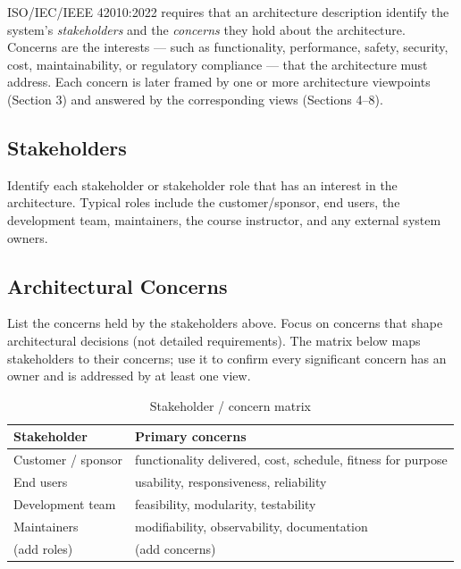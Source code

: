 ISO/IEC/IEEE 42010:2022 \cite{ISO42010} requires that an architecture description identify the system's \textit{stakeholders} and the \textit{concerns} they hold about the architecture. Concerns are the interests --- such as functionality, performance, safety, security, cost, maintainability, or regulatory compliance --- that the architecture must address. Each concern is later framed by one or more architecture viewpoints (Section 3) and answered by the corresponding views (Sections 4--8).

\subsection{Stakeholders}
Identify each stakeholder or stakeholder role that has an interest in the architecture. Typical roles include the customer/sponsor, end users, the development team, maintainers, the course instructor, and any external system owners.

\subsection{Architectural Concerns}
List the concerns held by the stakeholders above. Focus on concerns that shape architectural decisions (not detailed requirements). The matrix below maps stakeholders to their concerns; use it to confirm every significant concern has an owner and is addressed by at least one view.

\begin{table}[H]
\caption{Stakeholder / concern matrix}
\begin{center}
    \begin{tabular}{ | p{4cm} | p{9cm} |}
    \hline
    \textbf{Stakeholder} & \textbf{Primary concerns} \\ \hline
    Customer / sponsor & functionality delivered, cost, schedule, fitness for purpose \\ \hline
    End users & usability, responsiveness, reliability \\ \hline
    Development team & feasibility, modularity, testability \\ \hline
    Maintainers & modifiability, observability, documentation \\ \hline
    (add roles) & (add concerns) \\ \hline
    \end{tabular}
\end{center}
\end{table}
